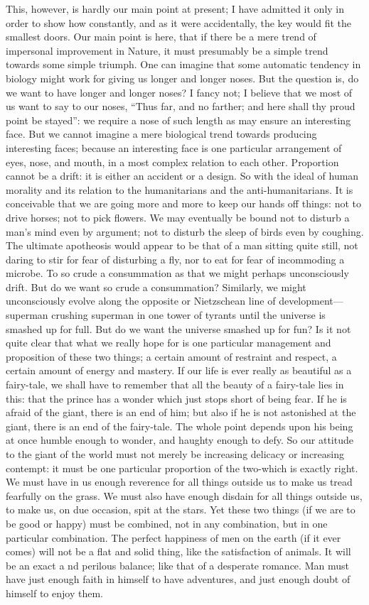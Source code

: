 \documentclass{book}
\begin{document}
This, however, is hardly our main point at present; I have admitted it only in order to show how constantly, and as it were accidentally, the key would fit the smallest doors. Our main point is here, that if there be a mere trend of impersonal improvement in Nature, it must presumably be a simple trend towards some simple triumph. One can imagine that some automatic tendency in biology might work for giving us longer and longer noses. But the question is, do we want to have longer and longer noses? I fancy not; I believe that we most of us want to say to our noses, “Thus far, and no farther; and here shall thy proud point be stayed”: we require a nose of such length as may ensure an interesting face. But we cannot imagine a mere biological trend towards producing interesting faces; because an interesting face is one particular arrangement of eyes, nose, and mouth, in a most complex relation to each other. Proportion cannot be a drift: it is either an accident or a design. So with the ideal of human morality and its relation to the humanitarians and the anti-humanitarians. It is conceivable that we are going more and more to keep our hands off things: not to drive horses; not to pick flowers. We may eventually be bound not to disturb a man’s mind even by argument; not to disturb the sleep of birds even by coughing. The ultimate apotheosis would appear to be that of a man sitting quite still, not daring to stir for fear of disturbing a fly, nor to eat for fear of incommoding a microbe. To so crude a consummation as that we might perhaps unconsciously drift. But do we want so crude a consummation? Similarly, we might unconsciously evolve along the opposite or Nietzschean line of development—superman crushing superman in one tower of tyrants until the universe is smashed up for full. But do we want the universe smashed up for fun? Is it not quite clear that what we really hope for is one particular management and proposition of these two things; a certain amount of restraint and respect, a certain amount of energy and mastery. If our life is ever really as beautiful as a fairy-tale, we shall have to remember that all the beauty of a fairy-tale lies in this: that the prince has a wonder which just stops short of being fear. If he is afraid of the giant, there is an end of him; but also if he is not astonished at the giant, there is an end of the fairy-tale. The whole point depends upon his being at once humble enough to wonder, and haughty enough to defy. So our attitude to the giant of the world must not merely be increasing delicacy or increasing contempt: it must be one particular proportion of the two-which is exactly right. We must have in us enough reverence for all things outside us to make us tread fearfully on the grass. We must also have enough disdain for all things outside us, to make us, on due occasion, spit at the stars. Yet these two things (if we are to be good or happy) must be combined, not in any combination, but in one particular combination. The perfect happiness of men on the earth (if it ever comes) will not be a flat and solid thing, like the satisfaction of animals. It will be an exact a nd perilous balance; like that of a desperate romance. Man must have just enough faith in himself to have adventures, and just enough doubt of himself to enjoy them.
\end{document}
